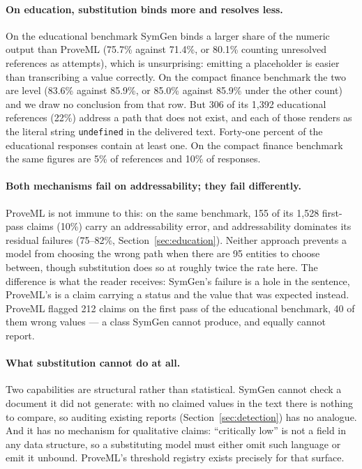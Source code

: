 \documentclass[11pt,a4paper]{article}
\begin{document}
\paragraph{On education, substitution binds more and resolves less.} On the educational benchmark SymGen binds a larger share of the numeric output than ProveML (75.7\% against 71.4\%, or 80.1\% counting unresolved references as attempts), which is unsurprising: emitting a placeholder is easier than transcribing a value correctly. On the compact finance benchmark the two are level (83.6\% against 85.9\%, or 85.0\% against 85.9\% under the other count) and we draw no conclusion from that row. But 306 of its 1{,}392 educational references (22\%) address a path that does not exist, and each of those renders as the literal string \texttt{undefined} in the delivered text. Forty-one percent of the educational responses contain at least one. On the compact finance benchmark the same figures are 5\% of references and 10\% of responses.

\paragraph{Both mechanisms fail on addressability; they fail differently.} ProveML is not immune to this: on the same benchmark, 155 of its 1{,}528 first-pass claims (10\%) carry an addressability error, and addressability dominates its residual failures (75--82\%, Section~\ref{sec:education}). Neither approach prevents a model from choosing the wrong path when there are 95 entities to choose between, though substitution does so at roughly twice the rate here. The difference is what the reader receives: SymGen's failure is a hole in the sentence, ProveML's is a claim carrying a status and the value that was expected instead. ProveML flagged 212 claims on the first pass of the educational benchmark, 40 of them wrong values --- a class SymGen cannot produce, and equally cannot report.

\paragraph{What substitution cannot do at all.} Two capabilities are structural rather than statistical. SymGen cannot check a document it did not generate: with no claimed values in the text there is nothing to compare, so auditing existing reports (Section~\ref{sec:detection}) has no analogue. And it has no mechanism for qualitative claims: ``critically low'' is not a field in any data structure, so a substituting model must either omit such language or emit it unbound. ProveML's threshold registry exists precisely for that surface.
\end{document}
